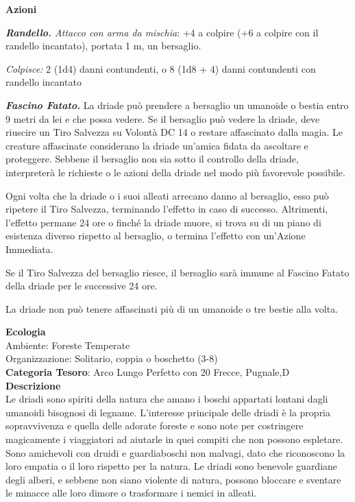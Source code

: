 \begin{multicols}{2}
{\textbf{Azioni}

\emph{\textbf{Randello.} Attacco con arma da mischia}: +4 a colpire (+6 a colpire con il randello incantato), portata 1 m, un bersaglio.

\emph{Colpisce:} 2 (1d4) danni contundenti, o 8 (1d8 + 4) danni contundenti con randello incantato

\emph{\textbf{Fascino Fatato.}} La driade può prendere a bersaglio un umanoide o bestia entro 9 metri da lei e che possa vedere. Se il bersaglio può vedere la driade, deve riuscire un Tiro Salvezza su Volontà DC 14 o restare affascinato dalla magia. Le creature affascinate considerano la driade un'amica fidata da ascoltare e proteggere. Sebbene il bersaglio non sia sotto il controllo della driade, interpreterà le richieste o le azioni della driade nel modo più favorevole possibile.

Ogni volta che la driade o i suoi alleati arrecano danno al bersaglio, esso può ripetere il Tiro Salvezza, terminando l'effetto in caso di successo. Altrimenti, l'effetto permane 24 ore o finché la driade muore, si trova su di un piano di esistenza diverso rispetto al bersaglio, o termina l'effetto con un'Azione Immediata.

Se il Tiro Salvezza del bersaglio riesce, il bersaglio sarà immune al Fascino Fatato della driade per le successive 24 ore.

La driade non può tenere affascinati più di un umanoide o tre bestie alla volta.

\textbf{Ecologia}\\
Ambiente: Foreste Temperate\\
Organizzazione: Solitario, coppia o boschetto (3-8)\\
\textbf{Categoria Tesoro}: Arco Lungo Perfetto con 20 Frecce, Pugnale,D\\
\textbf{Descrizione}\\
Le driadi sono spiriti della natura che amano i boschi appartati lontani dagli umanoidi bisognosi di legname. L'interesse principale delle driadi è la propria sopravvivenza e quella delle adorate foreste e sono note per costringere magicamente i viaggiatori ad aiutarle in quei compiti che non possono espletare.
Sono amichevoli con druidi e guardiaboschi non malvagi, dato che riconoscono la loro empatia o il loro rispetto per la natura.
Le driadi sono benevole guardiane degli alberi, e sebbene non siano violente di natura, possono bloccare e sventare le minacce alle loro dimore o trasformare i nemici in alleati.

}
\end{multicols}
